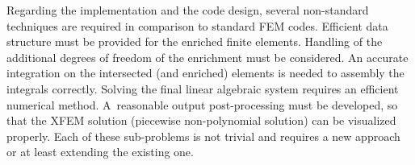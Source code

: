 
Regarding the implementation and the code design, several non-standard techniques are required
in comparison to standard FEM codes.
Efficient data structure must be provided for the enriched finite elements.
Handling of the additional degrees of freedom of the enrichment must be considered.
An accurate integration on the intersected (and enriched) elements is needed to assembly the integrals correctly. 
Solving the final linear algebraic system requires an efficient numerical method.
A~reasonable output post-processing must be developed, so that the XFEM solution (piecewise non-polynomial solution)
can be visualized properly.
Each of these sub-problems is not trivial and requires a new approach or at least extending the existing one.


% 
% 

